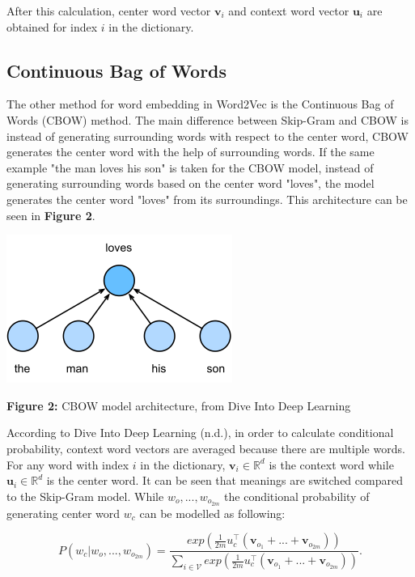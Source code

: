 \documentclass[man]{apa7}
\begin{document}
After this calculation, center word vector $\mathbf{v}_i$ and context word vector $\mathbf{u}_i$ are obtained for index $i$ in the dictionary.

\subsection{Continuous Bag of Words}
The other method for word embedding in Word2Vec is the Continuous Bag of Words (CBOW) method. The main difference between Skip-Gram and CBOW is instead of generating surrounding words with respect to the center word, CBOW generates the center word with the help of surrounding words. If the same example "the man loves his son" is taken for the CBOW model, instead of generating surrounding words based on the center word "loves", the model generates the center word "loves" from its surroundings. This architecture can be seen in \textbf{Figure 2}.
\\[2\baselineskip]

\begin{center}
\includegraphics[scale=1]{cbow.png}

\textbf{Figure 2:} CBOW model architecture, from Dive Into Deep Learning\\[2\baselineskip]

\end{center}

According to Dive Into Deep Learning (n.d.), in order to calculate conditional probability, context word vectors are averaged because there are multiple words. For any word with index $i$ in the dictionary, $\mathbf{v_\mathit{i}} \in \mathbb{R}^d$ is the context word while $\mathbf{u_\mathit{i}} \in \mathbb{R}^d$  is the center word. It can be seen that meanings are switched compared to the Skip-Gram model. While $w_o,...,w_{o_{2m}}$ the conditional probability of generating center word $w_c$ can be modelled as following:

\begin{equation}
P(w_c|w_o,...,w_{o_{2m}}) = \frac{exp(\frac{1}{2m}u_c^\top(\mathbf{v}_{o_1}+...+\mathbf{v}_{o_{2m}}))}{\sum_{i \in \mathcal{V}} exp(\frac{1}{2m}u_c^\top(\mathbf{v}_{o_1}+...+\mathbf{v}_{o_{2m}}))}.
\end{equation}
\end{document}
